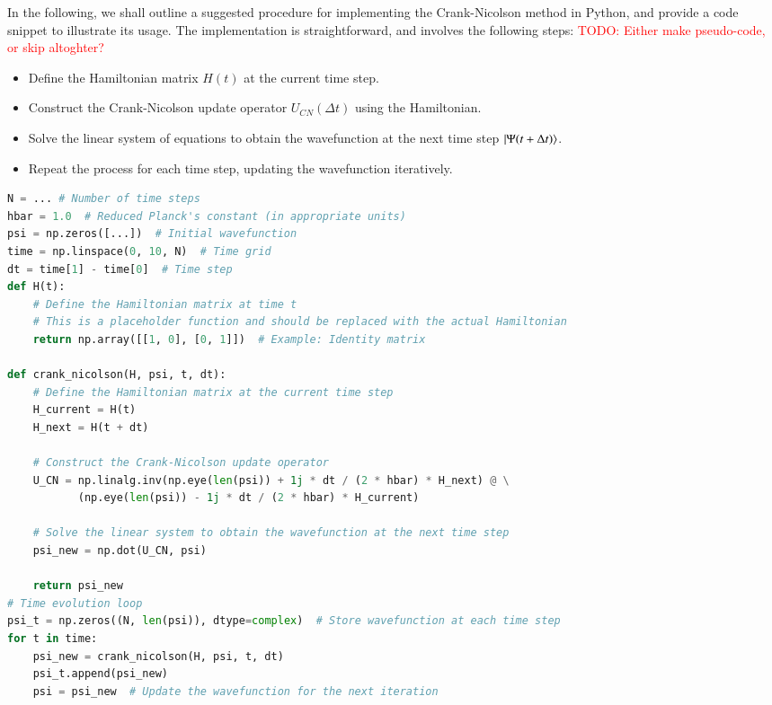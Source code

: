 \documentclass{subfiles}
\begin{document}
In the following, we shall outline a suggested procedure for implementing the Crank-Nicolson method in Python, and provide a code snippet to illustrate its usage. The implementation is straightforward, and involves the following steps: \textcolor{red}{TODO: Either make pseudo-code, or skip altoghter?}
\begin{itemize}
    \item Define the Hamiltonian matrix $H(t)$ at the current time step.
    \item Construct the Crank-Nicolson update operator $U_{CN}(\Delta t)$ using the Hamiltonian.
    \item Solve the linear system of equations to obtain the wavefunction at the next time step $\ket{\Psi(t + \Delta t)}$.
    \item Repeat the process for each time step, updating the wavefunction iteratively.
\end{itemize}
\begin{lstlisting}[language=Python]
N = ... # Number of time steps
hbar = 1.0  # Reduced Planck's constant (in appropriate units)
psi = np.zeros([...])  # Initial wavefunction
time = np.linspace(0, 10, N)  # Time grid
dt = time[1] - time[0]  # Time step
def H(t):
    # Define the Hamiltonian matrix at time t
    # This is a placeholder function and should be replaced with the actual Hamiltonian
    return np.array([[1, 0], [0, 1]])  # Example: Identity matrix

def crank_nicolson(H, psi, t, dt):
    # Define the Hamiltonian matrix at the current time step
    H_current = H(t)
    H_next = H(t + dt)
    
    # Construct the Crank-Nicolson update operator
    U_CN = np.linalg.inv(np.eye(len(psi)) + 1j * dt / (2 * hbar) * H_next) @ \
           (np.eye(len(psi)) - 1j * dt / (2 * hbar) * H_current)
    
    # Solve the linear system to obtain the wavefunction at the next time step
    psi_new = np.dot(U_CN, psi)
    
    return psi_new
# Time evolution loop
psi_t = np.zeros((N, len(psi)), dtype=complex)  # Store wavefunction at each time step
for t in time:
    psi_new = crank_nicolson(H, psi, t, dt)
    psi_t.append(psi_new)
    psi = psi_new  # Update the wavefunction for the next iteration
\end{lstlisting}
\\\\
\end{document}
